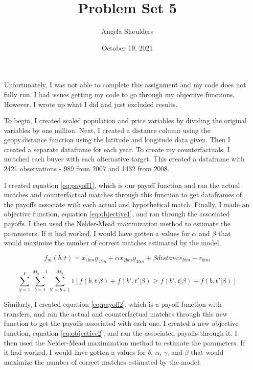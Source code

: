 \documentclass{article}[12pt]
\begin{document}
\title{Problem Set 5}
\author{Angela Shoulders}
\date{October 19, 2021}

\maketitle

Unfortunately, I was not able to complete this assignment and my code does not fully run.  I had issues getting my code to go through my objective functions.  However, I wrote up what I did and just excluded results.

To begin, I created scaled population and price variables by dividing the original variables by one million.  Next, I created a distance column using the geopy.distance function using the latitude and longitude data given.  Then I created a separate dataframe for each year.  To create my counterfactuals, I matched each buyer with each alternative target.  This created a dataframe with 2421 observations - 989 from 2007 and 1432 from 2008.

I created equation \ref{eq:payoff1}, which is our payoff function and ran the actual matches and counterfactual matches through this function to get dataframes of the payoffs associate with each actual and hypothetical match.  Finally, I made an objective function, equation \ref{eq:objective1}, and ran through the associated payoffs.  I then used the Nelder-Mead maximization method to estimate the parameters.  If it had worked, I would have gotten a values for $\alpha$ and $\beta$ that would maximize the number of correct matches estimated by the model.

\begin{equation}
    \label{eq:payoff1}
    f_m(b,t) = x_{1bm} y_{1tm} + \alpha x_{2bm} y_{1tm} + \beta distance_{btm} + \epsilon_{btm}
\end{equation}

\begin{equation}
    \label{eq:objective1}
    \sum_{y=1}^{Y} \sum_{b=1}^{M_y - 1} \sum_{b'=b+1}^{M_y} 1[f(b,t|\beta) + f(b',t'|\beta) \geq f(b',t|\beta) + f(b,t'|\beta)]
\end{equation}

Similarly, I created equation \ref{eq:payoff2}, which is a payoff function with transfers, and ran the actual and counterfactual matches through this new function to get the payoffs associated with each one.  I created a new objective function, equation \ref{eq:objective2}, and ran the associated payoffs through it.  I then used the Nelder-Mead maximization method to estimate the parameters.  If it had worked, I would have gotten a values for $\delta$, $\alpha$, $\gamma$, and $\beta$ that would maximize the number of correct matches estimated by the model.
\end{document}
